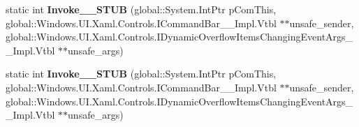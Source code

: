\begin{DoxyCompactItemize}
\mbox{\label{struct_windows_1_1_foundation_1_1_typed_event_handler___a___windows___u_i___xaml___controls___co63bd2e5cd00e6ef40624678b07024809_a8a81628682d0a0ebfec7ca21cde8d724}} 
static int {\bfseries Invoke\+\_\+\+\_\+\+S\+T\+UB} (global\+::\+System.\+Int\+Ptr p\+Com\+This, global\+::\+Windows.\+U\+I.\+Xaml.\+Controls.\+I\+Command\+Bar\+\_\+\+\_\+\+Impl.\+Vtbl $\ast$$\ast$unsafe\+\_\+sender, global\+::\+Windows.\+U\+I.\+Xaml.\+Controls.\+I\+Dynamic\+Overflow\+Items\+Changing\+Event\+Args\+\_\+\+\_\+\+Impl.\+Vtbl $\ast$$\ast$unsafe\+\_\+args)
\item 
\mbox{\label{struct_windows_1_1_foundation_1_1_typed_event_handler___a___windows___u_i___xaml___controls___co63bd2e5cd00e6ef40624678b07024809_a8a81628682d0a0ebfec7ca21cde8d724}} 
static int {\bfseries Invoke\+\_\+\+\_\+\+S\+T\+UB} (global\+::\+System.\+Int\+Ptr p\+Com\+This, global\+::\+Windows.\+U\+I.\+Xaml.\+Controls.\+I\+Command\+Bar\+\_\+\+\_\+\+Impl.\+Vtbl $\ast$$\ast$unsafe\+\_\+sender, global\+::\+Windows.\+U\+I.\+Xaml.\+Controls.\+I\+Dynamic\+Overflow\+Items\+Changing\+Event\+Args\+\_\+\+\_\+\+Impl.\+Vtbl $\ast$$\ast$unsafe\+\_\+args)
\end{DoxyCompactItemize}
